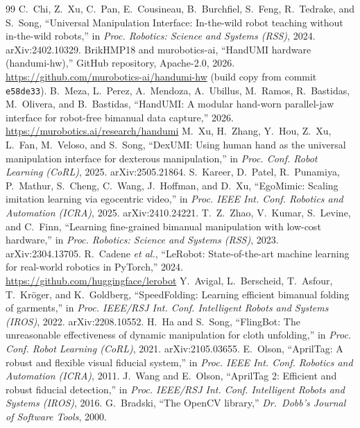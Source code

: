 \documentclass[conference,10pt]{IEEEtran}
\begin{document}
\begin{thebibliography}{99}\footnotesize
{} C.~Chi, Z.~Xu, C.~Pan, E.~Cousineau, B.~Burchfiel, S.~Feng, R.~Tedrake, and S.~Song, ``Universal
Manipulation Interface: In-the-wild robot teaching without in-the-wild robots,'' in \emph{Proc. Robotics: Science and Systems
(RSS)}, 2024. arXiv:2402.10329.
 BrikHMP18 and murobotics-ai, ``HandUMI hardware (handumi-hw),'' GitHub repository, Apache-2.0, 2026.
\url{https://github.com/murobotics-ai/handumi-hw} (build copy from commit \texttt{e58de33}).
 B.~Meza, L.~Perez, A.~Mendoza, A.~Ubillus, M.~Ramos, R.~Bastidas, M.~Olivera, and B.~Bastidas,
``HandUMI: A modular hand-worn parallel-jaw interface for robot-free bimanual data capture,'' 2026.
\url{https://murobotics.ai/research/handumi}
 M.~Xu, H.~Zhang, Y.~Hou, Z.~Xu, L.~Fan, M.~Veloso, and S.~Song, ``DexUMI: Using human hand as the
universal manipulation interface for dexterous manipulation,'' in \emph{Proc. Conf. Robot Learning (CoRL)}, 2025.
arXiv:2505.21864.
 S.~Kareer, D.~Patel, R.~Punamiya, P.~Mathur, S.~Cheng, C.~Wang, J.~Hoffman, and D.~Xu,
``EgoMimic: Scaling imitation learning via egocentric video,'' in \emph{Proc. IEEE Int. Conf. Robotics and Automation
(ICRA)}, 2025. arXiv:2410.24221.
 T.~Z.~Zhao, V.~Kumar, S.~Levine, and C.~Finn, ``Learning fine-grained bimanual manipulation with
low-cost hardware,'' in \emph{Proc. Robotics: Science and Systems (RSS)}, 2023. arXiv:2304.13705.
 R.~Cadene \emph{et al.}, ``LeRobot: State-of-the-art machine learning for real-world robotics in
PyTorch,'' 2024. \url{https://github.com/huggingface/lerobot}
 Y.~Avigal, L.~Berscheid, T.~Asfour, T.~Kr\"oger, and K.~Goldberg, ``SpeedFolding: Learning
efficient bimanual folding of garments,'' in \emph{Proc. IEEE/RSJ Int. Conf. Intelligent Robots and Systems (IROS)}, 2022.
arXiv:2208.10552.
 H.~Ha and S.~Song, ``FlingBot: The unreasonable effectiveness of dynamic manipulation for cloth
unfolding,'' in \emph{Proc. Conf. Robot Learning (CoRL)}, 2021. arXiv:2105.03655.
 E.~Olson, ``AprilTag: A robust and flexible visual fiducial system,'' in \emph{Proc. IEEE Int.
Conf. Robotics and Automation (ICRA)}, 2011.
 J.~Wang and E.~Olson, ``AprilTag 2: Efficient and robust fiducial detection,'' in \emph{Proc.
IEEE/RSJ Int. Conf. Intelligent Robots and Systems (IROS)}, 2016.
 G.~Bradski, ``The OpenCV library,'' \emph{Dr.\ Dobb's Journal of Software Tools}, 2000.

\end{thebibliography}
\end{document}

